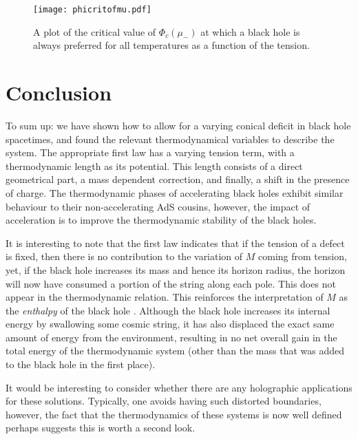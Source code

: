 \documentclass[
twoside,
openright,
frontopenright
]{dmathesis}
\begin{document}
\begin{figure} 
  \centering
  \texttt{[image: phicritofmu.pdf]}
  \caption{\label{fig:phicrit}A plot of the critical value of $\Phi_c(\mu_-)$ at
    which a black hole is always preferred for all temperatures as a function of
    the tension.}
\end{figure}

\section{Conclusion}

To sum up: we have shown how to allow for a varying conical deficit
in black hole spacetimes, and found the relevant thermodynamical 
variables to describe the system. The appropriate first law has a 
varying tension term, with a thermodynamic length as its potential. 
This length consists of a direct geometrical part, a mass dependent correction, 
and finally, a shift in the presence of charge. The thermodynamic phases of
accelerating black holes exhibit similar behaviour to their non-accelerating 
AdS cousins, however, the impact of acceleration is to improve the thermodynamic
stability of the black holes.

It is interesting to note that the first law indicates that if the tension of a
defect is fixed, then there is no contribution to the variation of $M$ coming
from tension, yet, if the black hole increases its mass and hence its horizon
radius, the horizon will now have consumed a portion of the string along each
pole.  This does not appear in the thermodynamic relation. This reinforces the
interpretation of $M$ as the {\it enthalpy} of the black hole
\cite{Kastor:2009wy}.  Although the black hole increases its internal energy by
swallowing some cosmic string, it has also displaced the exact same amount of
energy from the environment, resulting in no net overall gain in the total
energy of the thermodynamic system (other than the mass that was added to the
black hole in the first place).

It would be interesting to consider whether there are any holographic
applications for these solutions. Typically, one avoids having such distorted
boundaries, however, the fact that the thermodynamics of these systems is now
well defined perhaps suggests this is worth a second look.
\end{document}
